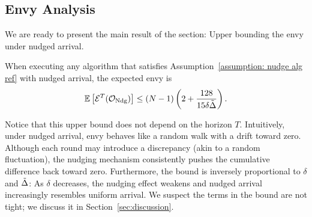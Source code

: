 \subsection{Envy Analysis}\label{Envy Analysis}
We are ready to present the main result of the section: Upper bounding the envy under nudged arrival.
\begin{theorem}\label{thm: sugg-envy}
    When executing any algorithm that satisfies Assumption~\ref{assumption: nudge alg ref} with nudged arrival, the expected envy is
    \[\mathbb{E}\left[ \mathcal{E}^T({\mathcal O_{\textnormal{Ndg}}}) \right]\leq (N-1)\left(2+\frac{128}{15\delta \tilde\Delta}\right) .\]
\end{theorem}
Notice that this upper bound does not depend on the horizon $T$. Intuitively, under nudged arrival, envy behaves like a random walk with a drift toward zero. Although each round may introduce a discrepancy (akin to a random fluctuation), the nudging mechanism consistently pushes the cumulative difference back toward zero. Furthermore, the bound is inversely proportional to $\delta$ and $\tilde\Delta$: As $\delta$ decreases, the nudging effect weakens and nudged arrival increasingly resembles uniform arrival. We suspect the terms in the bound are not tight; we discuss it in Section~\ref{sec:discussion}.
